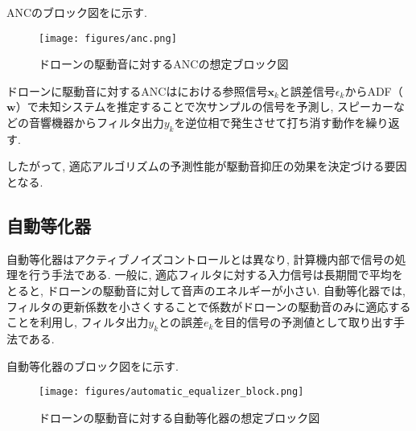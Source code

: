 ANCのブロック図をに示す. 

\begin{figure}[H]
\centering
\texttt{[image: figures/anc.png]}
\caption{ドローンの駆動音に対するANCの想定ブロック図}
\label{fig:anc_block}
\end{figure}

ドローンに駆動音に対するANCはにおける参照信号\(\bm{x}_k\)と誤差信号\(\epsilon_k\)からADF（\(\bm{w}\)）で未知システムを推定することで次サンプルの信号を予測し, スピーカーなどの音響機器からフィルタ出力\(y_k\)を逆位相で発生させて打ち消す動作を繰り返す. 

したがって, 適応アルゴリズムの予測性能が駆動音抑圧の効果を決定づける要因となる. 

\subsection{自動等化器}\label{automatic-equalizer}

自動等化器はアクティブノイズコントロールとは異なり, 計算機内部で信号の処理を行う手法である. 
一般に, 適応フィルタに対する入力信号は長期間で平均をとると, ドローンの駆動音に対して音声のエネルギーが小さい. 自動等化器では, フィルタの更新係数を小さくすることで係数がドローンの駆動音のみに適応することを利用し, フィルタ出力\(y_k\)との誤差\(e_k\)を目的信号の予測値として取り出す手法である. 

自動等化器のブロック図をに示す. 

\begin{figure}[H]
\centering
\texttt{[image: figures/automatic\_equalizer\_block.png]}
\caption{ドローンの駆動音に対する自動等化器の想定ブロック図}
\label{equ:automatic_equlizer_block}
\end{figure}
